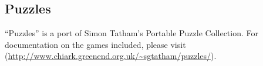 \subsection{Puzzles}

``Puzzles'' is a port of Simon Tatham's Portable Puzzle
Collection. For documentation on the games included, please visit
(\url{http://www.chiark.greenend.org.uk/~sgtatham/puzzles/}).
